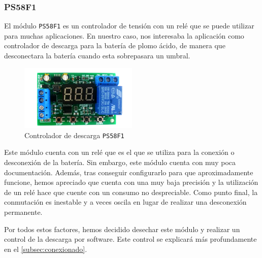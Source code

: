 \subsubsection{PS58F1}

El módulo \texttt{PS58F1} es un controlador de tensión con un relé que se puede utilizar para muchas aplicaciones. En nuestro caso, nos interesaba la aplicación como controlador de descarga para la batería de plomo ácido, de manera que desconectara la batería cuando esta sobrepasara un umbral.

\begin{figure}[H]
    \centering
    \includegraphics[width=0.5\textwidth]{images/2-hardware/componentes/PS58F1.png}
    \caption{Controlador de descarga \texttt{PS58F1}}
    \label{fig:hardware/modulos/controlador_descarga}
\end{figure}

Este módulo cuenta con un relé que es el que se utiliza para la conexión o desconexión de la batería. Sin embargo, este módulo cuenta con muy poca documentación. Además, tras conseguir configurarlo para que aproximadamente funcione, hemos apreciado que cuenta con una muy baja precisión y la utilización de un relé hace que cuente con un consumo no despreciable. Como punto final, la conmutación es inestable y a veces oscila en lugar de realizar una desconexión permanente.

Por todos estos factores, hemos decidido desechar este módulo y realizar un control de la descarga por software. Este control se explicará más profundamente en el \autoref{subsec:conexionado}. 